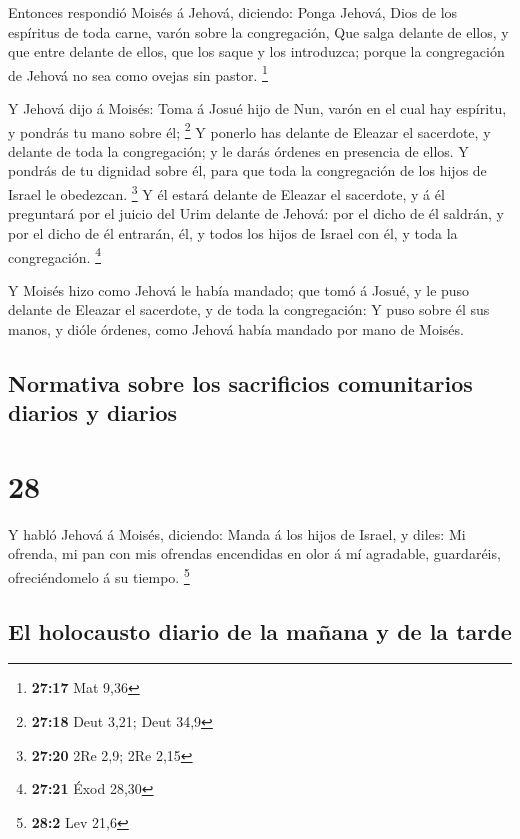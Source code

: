  Entonces respondió Moisés á Jehová, diciendo:
 Ponga Jehová, Dios de los espíritus de toda carne, varón
sobre la congregación,  Que salga delante de ellos, y que
entre delante de ellos, que los saque y los introduzca; porque la
congregación de Jehová no sea como ovejas sin pastor. \footnote{\textbf{27:17}
  Mat 9,36}

 Y Jehová dijo á Moisés: Toma á Josué hijo de Nun, varón
en el cual hay espíritu, y pondrás tu mano sobre él; \footnote{\textbf{27:18}
  Deut 3,21; Deut 34,9}  Y ponerlo has delante de Eleazar
el sacerdote, y delante de toda la congregación; y le darás órdenes en
presencia de ellos.  Y pondrás de tu dignidad sobre él,
para que toda la congregación de los hijos de Israel le obedezcan.
\footnote{\textbf{27:20} 2Re 2,9; 2Re 2,15}  Y él estará
delante de Eleazar el sacerdote, y á él preguntará por el juicio del
Urim delante de Jehová: por el dicho de él saldrán, y por el dicho de él
entrarán, él, y todos los hijos de Israel con él, y toda la
congregación. \footnote{\textbf{27:21} Éxod 28,30}

 Y Moisés hizo como Jehová le había mandado; que tomó á
Josué, y le puso delante de Eleazar el sacerdote, y de toda la
congregación:  Y puso sobre él sus manos, y dióle
órdenes, como Jehová había mandado por mano de Moisés.

\hypertarget{normativa-sobre-los-sacrificios-comunitarios-diarios-y-diarios}{%
\subsection{Normativa sobre los sacrificios comunitarios diarios y
diarios}\label{normativa-sobre-los-sacrificios-comunitarios-diarios-y-diarios}}

\hypertarget{section-27}{%
\section{28}\label{section-27}}

 Y habló Jehová á Moisés, diciendo:  Manda á
los hijos de Israel, y diles: Mi ofrenda, mi pan con mis ofrendas
encendidas en olor á mí agradable, guardaréis, ofreciéndomelo á su
tiempo. \footnote{\textbf{28:2} Lev 21,6}

\hypertarget{el-holocausto-diario-de-la-mauxf1ana-y-de-la-tarde}{%
\subsection{El holocausto diario de la mañana y de la
tarde}\label{el-holocausto-diario-de-la-mauxf1ana-y-de-la-tarde}}

